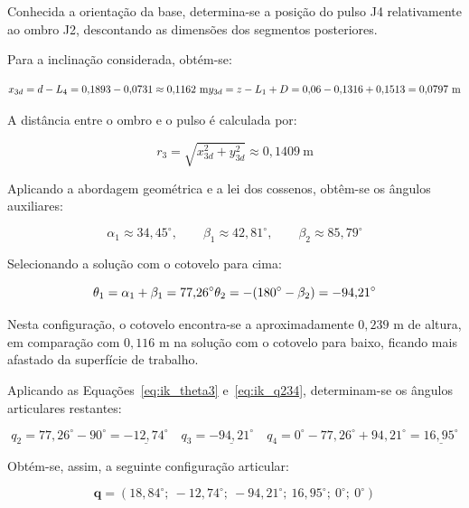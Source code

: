 Conhecida a orientação da base, determina-se a posição do pulso J4 relativamente ao ombro J2, descontando as dimensões dos segmentos posteriores.

Para a inclinação considerada, obtém-se:


\begin{equation}
    x_{3d} = d-L_4
    =0{,}1893-0{,}0731
    \approx0{,}1162\ \text{m}\\
    y_{3d} = z-L_1+D
    =0{,}06-0{,}1316+0{,}1513
    =0{,}0797\ \text{m}
\end{equation}

A distância entre o ombro e o pulso é calculada por:

\begin{equation}
    r_3=\sqrt{x_{3d}^2+y_{3d}^2}
    \approx0{,}1409\ \text{m}
\end{equation}

Aplicando a abordagem geométrica e a lei dos cossenos, obtêm-se os ângulos auxiliares:

\begin{equation}
    \alpha_1\approx34{,}45^\circ,\qquad
    \beta_1\approx42{,}81^\circ,\qquad
    \beta_2\approx85{,}79^\circ
\end{equation}

Selecionando a solução com o cotovelo para cima:

\begin{equation}
    \theta_1 =\alpha_1+\beta_1
    =77{,}26^\circ\\
    \theta_2 =-(180^\circ-\beta_2)
    =-94{,}21^\circ
\end{equation}

Nesta configuração, o cotovelo encontra-se a aproximadamente $0{,}239$ m de altura, em comparação com $0{,}116$ m na solução com o cotovelo para baixo, ficando mais afastado da superfície de trabalho.

Aplicando as Equações~\eqref{eq:ik_theta3} e~\eqref{eq:ik_q234}, determinam-se os ângulos articulares restantes:

\begin{equation}
    q_2 =77{,}26^\circ-90^\circ=\underline{-12{,}74^\circ}\quad
    q_3 =\underline{-94{,}21^\circ}\quad
    q_4 =0^\circ-77{,}26^\circ+94{,}21^\circ=\underline{16{,}95^\circ}
\end{equation}

Obtém-se, assim, a seguinte configuração articular:

\begin{equation}
    \boxed{
    \mathbf{q}=
    (18{,}84^\circ;\
    -12{,}74^\circ;\
    -94{,}21^\circ;\
    16{,}95^\circ;\
    0^\circ;\
    0^\circ)
    }
    \label{eq:ik_exemplo1}
\end{equation}

